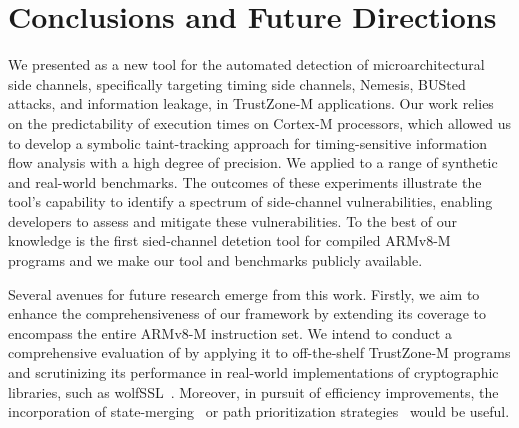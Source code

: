 \section{Conclusions and Future Directions}

We presented \tool{} as a new tool for the automated detection of
microarchitectural side channels, specifically targeting timing side
channels, Nemesis, BUSted attacks, and information leakage, in TrustZone-M
applications. Our work relies on the predictability of execution times on
Cortex-M processors, which allowed us to develop a symbolic taint-tracking
approach for timing-sensitive information flow analysis with a high degree
of precision. We applied \tool{} to a range of synthetic and real-world
benchmarks. The outcomes of these experiments illustrate the tool's
capability to identify a spectrum of side-channel vulnerabilities, enabling
developers to assess and mitigate these vulnerabilities. To the best of our
knowledge \tool{} is the first sied-channel detetion tool for compiled
ARMv8-M programs and we make our tool and benchmarks publicly available.

Several avenues for future research emerge from this work. Firstly, we aim
to enhance the comprehensiveness of our framework by extending its coverage
to encompass the entire ARMv8-M instruction set. We intend to conduct a
comprehensive evaluation of \tool{} by applying it to off-the-shelf
TrustZone-M programs and scrutinizing its performance in real-world
implementations of cryptographic libraries, such as wolfSSL~\cite{wolfssl}.
Moreover, in pursuit of efficiency improvements, the incorporation of
state-merging~\cite{kuznetsov2012efficient} or path prioritization
strategies~\cite{baldoni2018survey, li2013steering} would be useful.

